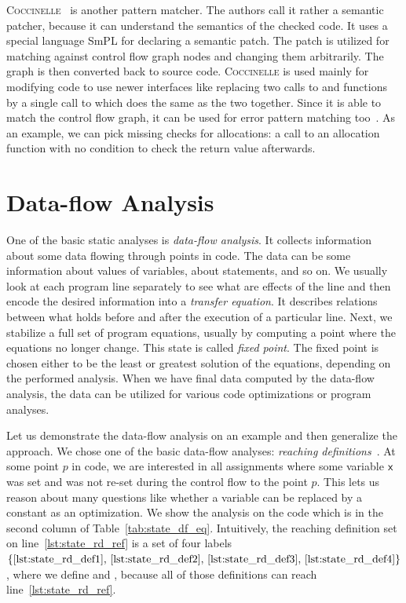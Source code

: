 \textsc{Coccinelle}~\cite{coccinelle} is another pattern matcher. The authors
call it rather a semantic patcher, because it can understand the semantics of
the checked code. It uses a special language SmPL for declaring a semantic
patch. The patch is utilized for matching against control flow graph nodes and
changing them arbitrarily. The graph is then converted back to source code.
\textsc{Coccinelle} is used mainly for modifying code to use newer interfaces
like replacing two calls to  and  functions by a
single call to  which does the same as the two together.  Since
it is able to match the control flow graph, it can be used for error pattern
matching too~\cite{wysiwib}. As an example, we can pick missing checks for
allocations: a call to an allocation function with no condition to check the
return value afterwards.

\section{Data-flow Analysis}\label{sec:data-flow}
One of the basic static analyses is \emph{data-flow analysis}. It collects
information about some data flowing through points in code. The data can be
some information about values of variables, about statements, and so on. We
usually look at each program line separately to see what are effects of the
line and then encode the desired information into a \emph{transfer equation}.
It describes relations between what holds before and after the execution of a
particular line. Next, we stabilize a full set of program equations, usually
by computing a point where the equations no longer change. This state is
called \emph{fixed point}. The fixed point is chosen either to be the least or
greatest solution of the equations, depending on the performed analysis. When
we have final data computed by the data-flow analysis, the data can be
utilized for various code optimizations or program analyses.

Let us demonstrate the data-flow analysis on an example and then generalize
the approach. We chose one of the basic data-flow analyses: \emph{reaching
definitions}~\cite[Section 9.2.4]{dragon}. At some point $p$ in code, we are
interested in all assignments where some variable $\mathsf{x}$ was set and was
not re-set during the control flow to the point $p$. This lets us reason about
many questions like whether a variable can be replaced by a constant as an
optimization.  We show the analysis on the code which is in the second
column of Table~\ref{tab:state_df_eq}.  Intuitively, the reaching definition
set on line~\ref{lst:state_rd_ref} is a set of four labels
$\{\ref{lst:state_rd_def1},\, \ref{lst:state_rd_def2},\,
\ref{lst:state_rd_def3},\, \ref{lst:state_rd_def4}\}$, where we define
 and , because all of those definitions can reach
line~\ref{lst:state_rd_ref}.

